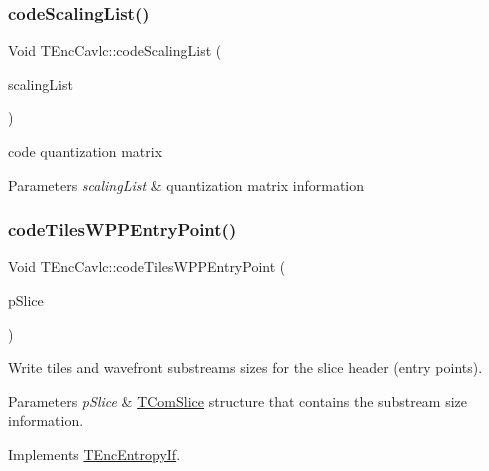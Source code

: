 \subsubsection{\texorpdfstring{code\+Scaling\+List()}{codeScalingList()}}
{\footnotesize\ttfamily Void T\+Enc\+Cavlc\+::code\+Scaling\+List (\begin{DoxyParamCaption}\item[{const \hyperlink{class_t_com_scaling_list}{T\+Com\+Scaling\+List} \&}]{scaling\+List }\end{DoxyParamCaption})}

code quantization matrix 
\begin{DoxyParams}{Parameters}
{\em scaling\+List} & quantization matrix information \\
\hline
\end{DoxyParams}
\mbox{\label{class_t_enc_cavlc_a5cfa78fc37f6ef09bb2c48445fe75d7f}} 
\subsubsection{\texorpdfstring{code\+Tiles\+W\+P\+P\+Entry\+Point()}{codeTilesWPPEntryPoint()}}
{\footnotesize\ttfamily Void T\+Enc\+Cavlc\+::code\+Tiles\+W\+P\+P\+Entry\+Point (\begin{DoxyParamCaption}\item[{\hyperlink{class_t_com_slice}{T\+Com\+Slice} $\ast$}]{p\+Slice }\end{DoxyParamCaption})\hspace{0.3cm}{\ttfamily [virtual]}}

Write tiles and wavefront substreams sizes for the slice header (entry points).


\begin{DoxyParams}{Parameters}
{\em p\+Slice} & \hyperlink{class_t_com_slice}{T\+Com\+Slice} structure that contains the substream size information. \\
\hline
\end{DoxyParams}


Implements \hyperlink{class_t_enc_entropy_if}{T\+Enc\+Entropy\+If}.

\mbox{\label{class_t_enc_cavlc_a8481a42fc17da67550d0c8d7c3b20888}} 
